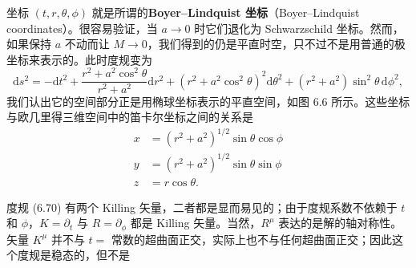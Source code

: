 坐标 $(t,r,\theta,\phi)$ 就是所谓的\textbf{Boyer–Lindquist 坐标}（Boyer–Lindquist coordinates）。很容易验证，当 $a\to 0$ 时它们退化为 Schwarzschild 坐标。然而，如果保持 $a$ 不动而让 $M\to 0$，我们得到的仍是平直时空，只不过不是用普通的极坐标来表示的。此时度规变为
\begin{equation*}
\mathrm{d}s^{2} = -\mathrm{d}t^{2} + \frac{r^{2}+a^{2}\cos^{2}\theta}{r^{2}+a^{2}}\mathrm{d}r^{2} + \left(r^{2}+a^{2}\cos^{2}\theta\right)^{2}\mathrm{d}\theta^{2} + \left(r^{2}+a^{2}\right)\sin^{2}\theta\,\mathrm{d}\phi^{2},
\tag{6.75}
\end{equation*}
我们认出它的空间部分正是用椭球坐标表示的平直空间，如图 6.6 所示。这些坐标与欧几里得三维空间中的笛卡尔坐标之间的关系是
\begin{align*}
x &= \left(r^{2}+a^{2}\right)^{1/2}\sin\theta\cos\phi\\
y &= \left(r^{2}+a^{2}\right)^{1/2}\sin\theta\sin\phi\\
z &= r\cos\theta.
\tag{6.76}
\end{align*}

度规 (6.70) 有两个 Killing 矢量，二者都是显而易见的；由于度规系数不依赖于 $t$ 和 $\phi$，$K=\partial_{t}$ 与 $R=\partial_{\phi}$ 都是 Killing 矢量。当然，$R^{\mu}$ 表达的是解的轴对称性。矢量 $K^{\mu}$ 并不与 $t=$ 常数的超曲面正交，实际上也不与任何超曲面正交；因此这个度规是稳态的，但不是
